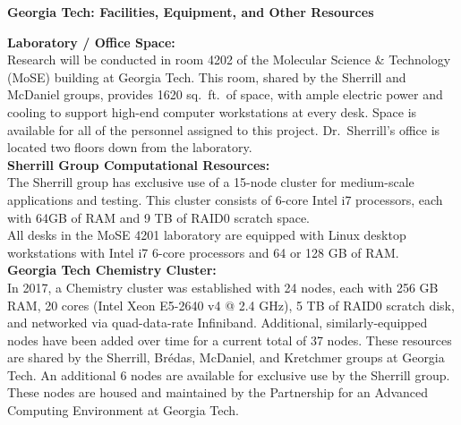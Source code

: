 \documentclass[12pt]{article}
\begin{document}
\begin{center}
{\large \bf Georgia Tech: Facilities, Equipment, and Other Resources}
\end{center}

\vspace*{0.5cm}

\noindent
{\bf Laboratory / Office Space:} \\
Research will be conducted in room 4202 of the Molecular Science \&
Technology (MoSE) building at Georgia Tech.  This room, shared by the
Sherrill and McDaniel groups, provides 1620 sq.~ft.~of space, with ample
electric power and cooling to support high-end computer workstations
at every desk.  Space is available for all of the personnel assigned
to this project.  Dr.~Sherrill's office is located two floors down from
the laboratory.
\\

\noindent
{\bf Sherrill Group Computational Resources:} \\
The Sherrill group has exclusive use of a 15-node cluster for medium-scale
applications and testing.  This cluster consists of 6-core Intel i7 processors,
each with 64GB of RAM and 9 TB of RAID0 scratch space.  
\\

\noindent
All desks in the MoSE 4201 laboratory are equipped with
Linux desktop workstations with Intel i7 6-core processors and 64 or 128 
GB of RAM.
\\

\noindent
{\bf Georgia Tech Chemistry Cluster:} \\
In 2017, a Chemistry cluster was established with 24 nodes, each with
256 GB RAM, 20 cores (Intel Xeon E5-2640 v4 @ 2.4 GHz), 5 TB of RAID0
scratch disk, and networked via quad-data-rate Infiniband.  Additional,
similarly-equipped nodes have been added over time for a current total
of 37 nodes.  These resources are shared by the Sherrill, Br{\'e}das,
McDaniel, and Kretchmer groups at Georgia Tech.
An additional 6 nodes
are available for exclusive use by the Sherrill group.  These nodes
are housed and maintained by the Partnership for an Advanced Computing
Environment at Georgia Tech.
\\
\end{document}
